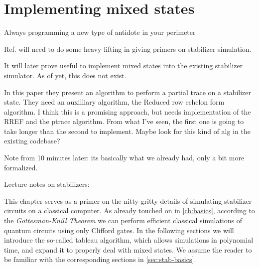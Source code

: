 \chapter{Implementing mixed states}
\label{ch:mixed}
\epigraph{Always programming a new type of antidote in your perimeter}{
\citeauthor{quasimotoDiscipline99Pt2000}
}

Ref. \cite{aaronsonImprovedSimulationStabilizer2004} will need to do some heavy
lifting in giving primers on stabilizer simulation.

It will later prove useful to implement mixed states into the existing
stabilizer simulator. As of yet, this does not exist.

In this paper \cite{audenaertEntanglementMixedStabilizer2005} they present an
algorithm to perform a partial trace on a stabilizer state. They need an
auxilliary algorithm, the Reduced row echelon form algorithm. I think this is a
promising approach, but needs implementation of the RREF and the ptrace
algorithm. From what I've seen, the first one is going to take longer than the
second to implement. Maybe look for this kind of alg in the existing codebase?

Note from 10 minutes later: its basically what we already had, only a bit more
formalized. 

Lecture notes on stabilizers: \cite{arabLectureNotesQuantum2024}

This chapter serves as a primer on the nitty-gritty details of simulating
stabilizer circuits on a classical computer. As already touched on in
\cref{ch:basics}, according to the \emph{Gottesman-Knill Theorem} we can
perform efficient classical simulations of quantum circuits using only Clifford
gates. In the following sections we will introduce the so-called tableau
algorithm, which allows simulations in polynomial time, and expand it to
properly deal with mixed states. We assume the reader to be familiar with the
corresponding sections in \cref{sec:stab-basics}.

